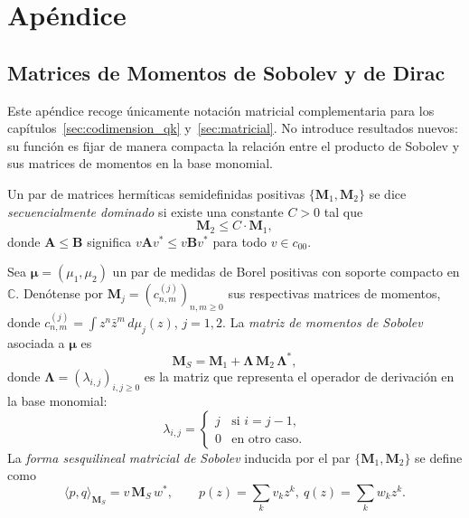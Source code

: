 \chapter{Apéndice}
\label{ch:an2}

\section{Matrices de Momentos de Sobolev y de Dirac}\label{ap:matrices_momentos}

Este apéndice recoge únicamente notación matricial complementaria para los capítulos~\ref{sec:codimension_qk} y~\ref{sec:matricial}. No introduce resultados nuevos: su función es fijar de manera compacta la relación entre el producto de Sobolev y sus matrices de momentos en la base monomial.

\begin{defn}\label{def:dominacion_secuencial_app}
	Un par de matrices hermíticas semidefinidas positivas $\{\mathbf{M}_1, \mathbf{M}_2\}$ se dice \emph{secuencialmente dominado} si existe una constante $C > 0$ tal que
	\[
		\mathbf{M}_2 \leq C \cdot \mathbf{M}_1,
	\]
	donde $\mathbf{A} \leq \mathbf{B}$ significa $v \mathbf{A} v^* \leq v \mathbf{B} v^*$ para todo $v \in c_{00}$.
\end{defn}

\begin{defn}\label{def:matriz_sobolev}
	Sea $\boldsymbol{\mu} = (\mu_1, \mu_2)$ un par de medidas de Borel positivas con soporte compacto en $\mathbb{C}$. Denótense por $\mathbf{M}_j = (c^{(j)}_{n,m})_{n,m \geq 0}$ sus respectivas matrices de momentos, donde $c^{(j)}_{n,m} = \int z^n \bar{z}^m \, d\mu_j(z)$, $j = 1, 2$. La \emph{matriz de momentos de Sobolev} asociada a $\boldsymbol{\mu}$ es
	\[
		\mathbf{M}_S = \mathbf{M}_1 + \boldsymbol{\Lambda}\, \mathbf{M}_2\, \boldsymbol{\Lambda}^*,
	\]
	donde $\boldsymbol{\Lambda} = (\lambda_{i,j})_{i,j \geq 0}$ es la matriz que representa el operador de derivación en la base monomial:
	\[
		\lambda_{i,j} = \begin{cases} j & \text{si } i = j - 1, \\ 0 & \text{en otro caso.} \end{cases}
	\]
	La \emph{forma sesquilineal matricial de Sobolev} inducida por el par $\{\mathbf{M}_1, \mathbf{M}_2\}$ se define como
	\[
		\langle p, q \rangle_{\mathbf{M}_S} = v\, \mathbf{M}_S\, w^*, \qquad p(z) = \sum_k v_k z^k,\ q(z) = \sum_k w_k z^k.
	\]
\end{defn}

